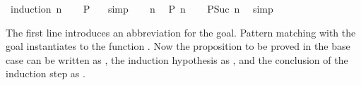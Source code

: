 \begin{isabellebody}
%
\isadelimproof
%
\endisadelimproof
%
\isatagproof
{}\isamarkupfalse%
\ {}induction\ n{}\isanewline
\ \ \isamarkupfalse%
\ {}{}P\ {}{}\ \isamarkupfalse%
\ simp\isanewline
{}\isamarkupfalse%
\isanewline
\ \ \isamarkupfalse%
\ n\ \isamarkupfalse%
\ {}{}P\ n{}\isanewline
\ \ \isamarkupfalse%
\ {}{}P{}Suc\ n{}{}\ \isamarkupfalse%
\ simp\isanewline
{}\isamarkupfalse%
%
\endisatagproof
{\isafoldproof}%
%
\isadelimproof
%
\endisadelimproof
%
\begin{isamarkuptext}%
The first line introduces an abbreviation  for the goal.
Pattern matching  with the goal instantiates  to the
function .  Now the proposition to
be proved in the base case can be written as , the induction
hypothesis as , and the conclusion of the induction step as
.


\end{isamarkuptext}
\end{isabellebody}
